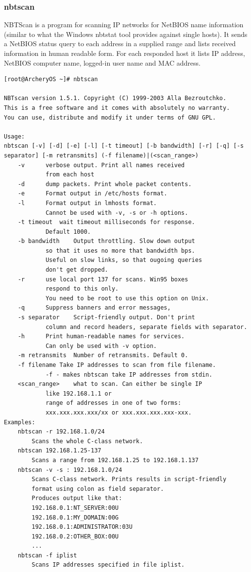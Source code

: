 \documentclass{article}
\begin{document}
\subsubsection{nbtscan}
NBTScan is a program for scanning IP networks for NetBIOS name information (similar to what the Windows nbtstat tool provides against single hosts). It sends a NetBIOS status query to each address in a supplied range and lists received information in human readable form. For each responded host it lists IP address, NetBIOS computer name, logged-in user name and MAC address.
\begin{lstlisting}
[root@ArcheryOS ~]# nbtscan

NBTscan version 1.5.1. Copyright (C) 1999-2003 Alla Bezroutchko.
This is a free software and it comes with absolutely no warranty.
You can use, distribute and modify it under terms of GNU GPL.

Usage:
nbtscan [-v] [-d] [-e] [-l] [-t timeout] [-b bandwidth] [-r] [-q] [-s separator] [-m retransmits] (-f filename)|(<scan_range>) 
	-v		verbose output. Print all names received
			from each host
	-d		dump packets. Print whole packet contents.
	-e		Format output in /etc/hosts format.
	-l		Format output in lmhosts format.
			Cannot be used with -v, -s or -h options.
	-t timeout	wait timeout milliseconds for response.
			Default 1000.
	-b bandwidth	Output throttling. Slow down output
			so that it uses no more that bandwidth bps.
			Useful on slow links, so that ougoing queries
			don't get dropped.
	-r		use local port 137 for scans. Win95 boxes
			respond to this only.
			You need to be root to use this option on Unix.
	-q		Suppress banners and error messages,
	-s separator	Script-friendly output. Don't print
			column and record headers, separate fields with separator.
	-h		Print human-readable names for services.
			Can only be used with -v option.
	-m retransmits	Number of retransmits. Default 0.
	-f filename	Take IP addresses to scan from file filename.
			-f - makes nbtscan take IP addresses from stdin.
	<scan_range>	what to scan. Can either be single IP
			like 192.168.1.1 or
			range of addresses in one of two forms: 
			xxx.xxx.xxx.xxx/xx or xxx.xxx.xxx.xxx-xxx.
Examples:
	nbtscan -r 192.168.1.0/24
		Scans the whole C-class network.
	nbtscan 192.168.1.25-137
		Scans a range from 192.168.1.25 to 192.168.1.137
	nbtscan -v -s : 192.168.1.0/24
		Scans C-class network. Prints results in script-friendly
		format using colon as field separator.
		Produces output like that:
		192.168.0.1:NT_SERVER:00U
		192.168.0.1:MY_DOMAIN:00G
		192.168.0.1:ADMINISTRATOR:03U
		192.168.0.2:OTHER_BOX:00U
		...
	nbtscan -f iplist
		Scans IP addresses specified in file iplist.
\end{lstlisting}
\end{document}
